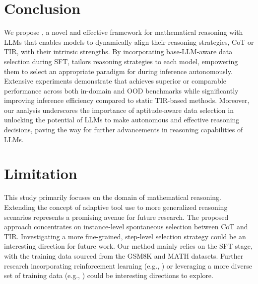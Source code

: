 \section{Conclusion}\label{sec:conclusion}
We propose {\method}, a novel and effective framework for mathematical reasoning with LLMs that enables models to dynamically align their reasoning strategies, CoT or TIR, with their intrinsic strengths. 
By incorporating base-LLM-aware data selection during SFT, {\method} tailors reasoning strategies to each model, empowering them to select an appropriate paradigm for during inference autonomously. 
Extensive experiments demonstrate that {\method} achieves superior or comparable performance across both in-domain and OOD benchmarks while significantly improving inference efficiency compared to static TIR-based methods. 
Moreover, our analysis underscores the importance of aptitude-aware data selection in unlocking the potential of LLMs to make autonomous and effective reasoning decisions, paving the way for further advancements in reasoning capabilities of LLMs.


\section*{Limitation}
This study primarily focuses on the domain of mathematical reasoning. 
Extending the concept of adaptive tool use to more generalized reasoning scenarios represents a promising avenue for future research.
The proposed approach concentrates on instance-level spontaneous selection between CoT and TIR.
Investigating a more fine-grained, step-level selection strategy could be an interesting direction for future work.
Our method mainly relies on the SFT stage, with the training data sourced from the GSM8K and MATH datasets. 
Further research incorporating reinforcement learning (e.g., \citep{deepseekr12025deepseekai}) or leveraging a more diverse set of training data (e.g., \citep{s12025muennighoff, limo2025ye}) could be interesting directions to explore.

